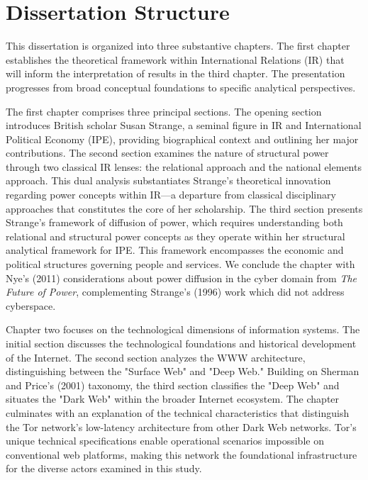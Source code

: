 \section{Dissertation Structure}

This dissertation is organized into three substantive chapters. The first chapter establishes the theoretical framework within International Relations (IR) that will inform the interpretation of results in the third chapter. The presentation progresses from broad conceptual foundations to specific analytical perspectives.

The first chapter comprises three principal sections. The opening section introduces British scholar Susan Strange, a seminal figure in IR and International Political Economy (IPE), providing biographical context and outlining her major contributions. The second section examines the nature of structural power through two classical IR lenses: the relational approach and the national elements approach. This dual analysis substantiates Strange's theoretical innovation regarding power concepts within IR—a departure from classical disciplinary approaches that constitutes the core of her scholarship. The third section presents Strange's framework of diffusion of power, which requires understanding both relational and structural power concepts as they operate within her structural analytical framework for IPE. This framework encompasses the economic and political structures governing people and services. We conclude the chapter with Nye's (2011) considerations about power diffusion in the cyber domain from \textit{The Future of Power}, complementing Strange's (1996) work which did not address cyberspace.

Chapter two focuses on the technological dimensions of information systems. The initial section discusses the technological foundations and historical development of the Internet. The second section analyzes the WWW architecture, distinguishing between the "Surface Web" and "Deep Web." Building on Sherman and Price's (2001) taxonomy, the third section classifies the "Deep Web" and situates the "Dark Web" within the broader Internet ecosystem. The chapter culminates with an explanation of the technical characteristics that distinguish the Tor network's low-latency architecture from other Dark Web networks. Tor's unique technical specifications enable operational scenarios impossible on conventional web platforms, making this network the foundational infrastructure for the diverse actors examined in this study.

